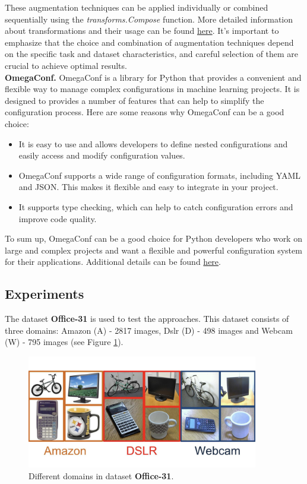 These augmentation techniques can be applied individually or combined sequentially using the \textit{transforms.Compose} function. More detailed information about transformations and their usage can be found \href{https://pytorch.org/vision/stable/transforms.html}{here}. It's important to emphasize that the choice and combination of augmentation techniques depend on the specific task and dataset characteristics, and careful selection of them are crucial to achieve optimal results.\\

\textbf{OmegaConf.} OmegaConf is a library for Python that provides a convenient and flexible way to manage complex configurations in machine learning projects. It is designed to provides a number of features that can help to simplify the configuration process. Here are some reasons why OmegaConf can be a good choice:

\begin{itemize}
    \item It is easy to use and allows developers to define nested configurations and easily access and modify configuration values.
    \item OmegaConf supports a wide range of configuration formats, including YAML and JSON. This makes it flexible and easy to integrate in your project.
    \item It supports type checking, which can help to catch configuration errors and improve code quality.
\end{itemize}
 
To sum up, OmegaConf can be a good choice for Python developers who work on large and complex projects and want a flexible and powerful configuration system for their applications. Additional details can be found \href{https://omegaconf.readthedocs.io/en/2.3_branch/}{here}.

\newpage

\subsection{Experiments}

The dataset \textbf{Office-31} is used to test the approaches. This dataset consists of three domains: Amazon (A) - 2817 images, Dslr (D) - 498 images and Webcam (W) - 795 images (see Figure \ref{fig:office}). 

\begin{figure}[H]
    \centering
    \includegraphics[width=0.9\textwidth]{Figures/Results/office-31.jpg}
    \caption{Different domains in dataset \textbf{Office-31}.}
    \label{fig:office}
\end{figure}

